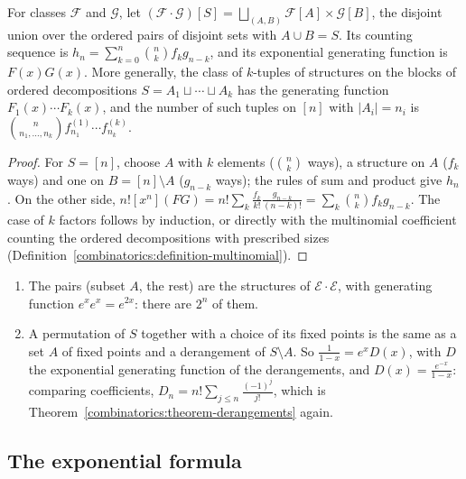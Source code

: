 \begin{theorem}\label{generating-functions:theorem-labelled-product}
For classes $\mathcal{F}$ and $\mathcal{G}$, let $(\mathcal{F} \cdot \mathcal{G})[S] = \bigsqcup_{(A, B)}\mathcal{F}[A] \times \mathcal{G}[B]$, the disjoint union over the ordered pairs of disjoint
sets with $A \cup B = S$. Its counting sequence is $h_n = \sum_{k=0}^{n}\binom{n}{k}f_kg_{n-k}$, and its exponential generating function is $F(x)G(x)$. More generally, the class of $k$-tuples of
structures on the blocks of ordered decompositions $S = A_1 \sqcup \cdots \sqcup A_k$ has the generating function $F_1(x) \cdots F_k(x)$, and the number of such tuples on $[n]$ with $|A_i| = n_i$ is
$\binom{n}{n_1, \ldots, n_k}f^{(1)}_{n_1} \cdots f^{(k)}_{n_k}$.
\end{theorem}

\begin{proof}
For $S = [n]$, choose $A$ with $k$ elements ($\binom{n}{k}$ ways), a structure on $A$ ($f_k$ ways) and one on $B = [n] \setminus A$ ($g_{n-k}$ ways); the rules of sum and product give $h_n$. On the
other side, $n![x^n](FG) = n!\sum_{k}\frac{f_k}{k!}\frac{g_{n-k}}{(n - k)!} = \sum_k\binom{n}{k}f_kg_{n-k}$. The case of $k$ factors follows by induction, or directly with the multinomial
coefficient counting the ordered decompositions with prescribed sizes (Definition~\ref{combinatorics:definition-multinomial}).
\end{proof}

\begin{example}\label{generating-functions:example-labelled-product}
\begin{enumerate}
\item The pairs (subset $A$, the rest) are the structures of $\mathcal{E} \cdot \mathcal{E}$, with generating function $e^xe^x = e^{2x}$: there are $2^n$ of them.
\item A permutation of $S$ together with a choice of its fixed points is the same as a set $A$ of fixed points and a derangement of $S \setminus A$. So $\frac{1}{1 - x} = e^xD(x)$, with $D$ the
exponential generating function of the derangements, and $D(x) = \frac{e^{-x}}{1 - x}$: comparing coefficients, $D_n = n!\sum_{j \leq n}\frac{(-1)^j}{j!}$, which is
Theorem~\ref{combinatorics:theorem-derangements} again.
\end{enumerate}
\end{example}

\subsection{The exponential formula}\label{generating-functions:subsection-exponential-formula}

